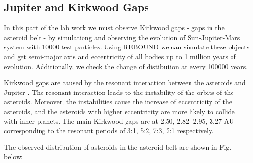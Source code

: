 \documentclass[12pt,a4paper]{article}
\begin{document}
\subsection{Jupiter and Kirkwood Gaps}

In this part of the lab work we must observe Kirkwood gaps - gaps in the asteroid belt - by simulationg and observing the evolution of Sun-Jupiter-Mars system with 10000 test particles. 
Using REBOUND we can simulate these objects and get semi-major axis and eccentricity of all bodies up to 1 million years of evolution. Additionally, we check the change of distibution at every 100000 years.

Kirkwood gaps are caused by the resonant interaction between the asteroids and Jupiter \cite{asteroids}. The resonant interaction leads to the instability of the orbits of the asteroids.
Moreover, the instabilities cause the increase of eccentricity of the asteroids, and the asteroids with higher eccentricity are more likely to collide with inner planets.
The main Kirkwood gaps are at 2.50, 2.82, 2.95, 3.27 AU corresponding to the resonant periods of 3:1, 5:2, 7:3, 2:1 respectively.

The observed distribution of asteroids in the asteroid belt are shown in Fig. \cite{fig:real_kirkwood} below:
\end{document}
